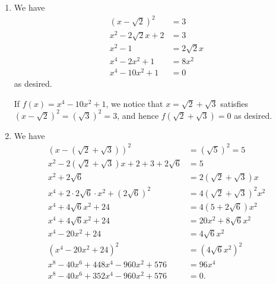 \Question{\currfilebase}

\begin{enumerate}
    \item We have
          \begin{align*}
              \left(x - \sqrt{2}\right)^2 & = 3            \\
              x^2 - 2\sqrt{2}x + 2        & = 3            \\
              x^2 - 1                     & = 2 \sqrt{2} x \\
              x^4 - 2x^2 + 1              & = 8x^2         \\
              x^4 - 10 x^2 + 1            & = 0
          \end{align*}
          as desired.

          If \(f(x) = x^4 - 10x^2 + 1\), we notice that \(x = \sqrt{2} + \sqrt{3}\) satisfies \(\left(x - \sqrt{2}\right)^2 = \left(\sqrt{3}\right)^2 = 3\), and hence \(f\left(\sqrt{2} + \sqrt{3}\right) = 0\) as desired.

    \item We have
          \begin{align*}
              \left(x - \left(\sqrt{2} + \sqrt{3}\right)\right)^2             & = \left(\sqrt{5}\right)^2 = 5              \\
              x^2 - 2 \left(\sqrt{2} + \sqrt{3}\right) x + 2 + 3 + 2 \sqrt{6} & = 5                                        \\
              x^2 + 2 \sqrt{6}                                                & = 2 \left(\sqrt{2} + \sqrt{3}\right) x     \\
              x^4 + 2 \cdot 2 \sqrt{6} \cdot x^2 + \left(2\sqrt{6}\right)^2   & = 4 \left(\sqrt{2} + \sqrt{3}\right)^2 x^2 \\
              x^4 + 4 \sqrt{6} x^2 + 24                                       & = 4 \left(5 + 2\sqrt{6}\right)x^2          \\
              x^4 + 4 \sqrt{6} x^2 + 24                                       & = 20 x^2 + 8 \sqrt{6} x^2                  \\
              x^4 - 20 x^2 + 24                                               & = 4 \sqrt{6} x^2                           \\
              \left(x^4 - 20 x^2 + 24\right)^2                                & = \left(4 \sqrt{6} x^2\right)^2            \\
              x^8 - 40 x^6 + 448 x^4 - 960 x^2 + 576                          & = 96 x^4                                   \\
              x^8 - 40 x^6 + 352 x^4 - 960 x^2 + 576                          & = 0.
          \end{align*}


\end{enumerate}
